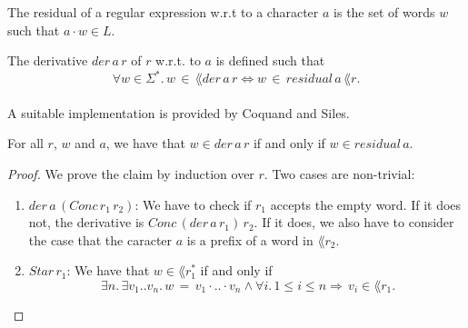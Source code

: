 \documentclass[11pt,a4paper,oneside]{book}
\begin{document}
                    \begin{definition}{}
                        \label{residual}
                        The residual of a regular expression w.r.t to a character $a$ is the set of words $w$ such that $a \cdot w \in L$.
                    \end{definition}

                    \begin{definition}{}
                        \label{residual}
                        The derivative $der \,  a \, r$ of $r$ w.r.t. to $a$ is defined such that 
                        \[
                            \forall w \in \Sigma^*. \, w \, \in \, \lang{der \, a \, r} \Leftrightarrow w \, \in \, residual \, a \, \lang{r}.
                        \]
                    \end{definition}

                    \paragraph{}
                        A suitable implementation is provided by Coquand and Siles.



                    \begin{theorem}
                        \label{der_correct}
                        For all $r$, $w$ and $a$, we have that $w \in der \, a \, r$ if and only if $w \in residual \, a $.
                    \end{theorem}

                    \begin{proof}
                        We prove the claim by induction over $r$. Two cases are non-trivial: 
                        \begin{enumerate}
                            \item
                                $der \, a \, (Conc \, r_1 \, r_2)$: 
                                We have to check if $r_1$ accepts the empty word. 
                                If it does not, the derivative is $Conc \, (der \, a \, r_1) \, r_2$.
                                If it does, we also have to consider the case that the caracter $a$ is a prefix of a word in $\lang{r_2}$.
                            \item
                                $Star \, r_1$: 
                                We have that $w \in \lang{r_1^*}$ if and only if 
                                \[
                                    \, \exists n. \, \exists v_1 .. v_n. \, w \, = \, v_1 \cdot .. \cdot v_n 
                                    \wedge \forall i. \, 1 \leq i \leq n 
                                    \Rightarrow
                                    \, v_i \in \lang{r_1}.
                                \]
                        \end{enumerate}
                    \end{proof}
\end{document}
